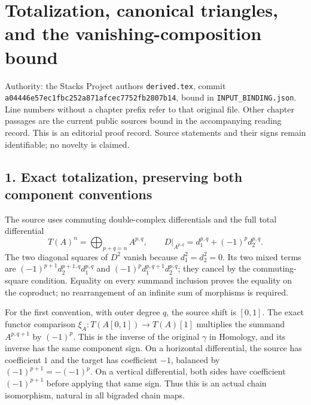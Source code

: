\section{\texorpdfstring{Totalization,\allowbreak{} canonical triangles,\allowbreak{} and the vanishing-composition bound}{ canonical  and the vanishing-composition bound}}\label{proofs-3487-4161-totalization-canonical-triangles-and-the-vanishing-composition-bound}

Authority:\allowbreak{} the Stacks Project authors\textquotesingle{} \texttt{derived.\allowbreak{}tex},\allowbreak{} commit \texttt{a04446e5\allowbreak{}7ec1fbc2\allowbreak{}52a871af\allowbreak{}cec7752f\allowbreak{}b2807b14},\allowbreak{} bound in \texttt{INPUT\_\allowbreak{}BINDING.\allowbreak{}json}. Line numbers without a chapter prefix refer to that original file. Other chapter passages are the current public sources bound in the accompanying reading record. This is an editorial proof record. Source statements and their signs remain identifiable; no novelty is claimed.

\subsection{\texorpdfstring{1. Exact totalization,\allowbreak{} preserving both component conventions}{1. Exact  preserving both component conventions}}\label{proofs-3487-4161-exact-totalization-preserving-both-component-conventions}

The source uses commuting double-complex differentials and the full total differential \[
T(A)^n=\bigoplus_{p+q=n}A^{p,q},\qquad
D|_{A^{p,q}}=d_1^{p,q}+(-1)^p d_2^{p,q}.
\] The two diagonal squares of \(D^2\) vanish because \(d_1^2=d_2^2=0\). Its two mixed terms are \((-1)^{p+1}d_2^{p+1,q}d_1^{p,q}\) and \((-1)^pd_1^{p,q+1}d_2^{p,q}\); they cancel by the commuting-square condition. Equality on every summand inclusion proves the equality on the coproduct; no rearrangement of an infinite sum of morphisms is required.

For the first convention,\allowbreak{} with outer degree \(q\),\allowbreak{} the source shift is \([0,1]\). The exact functor comparison \(\xi_A:T(A[0,1])\to T(A)[1]\) multiplies the summand \(A^{p,q+1}\) by \((-1)^p\). This is the inverse of the original \(\gamma\) in Homology,\allowbreak{} and its inverse has the same component sign. On a horizontal differential,\allowbreak{} the source has coefficient \(1\) and the target has coefficient \(-1\),\allowbreak{} balanced by \((-1)^{p+1}=-(-1)^p\). On a vertical differential,\allowbreak{} both sides have coefficient \((-1)^{p+1}\) before applying that same sign. Thus this is an actual chain isomorphism,\allowbreak{} natural in all bigraded chain maps.

